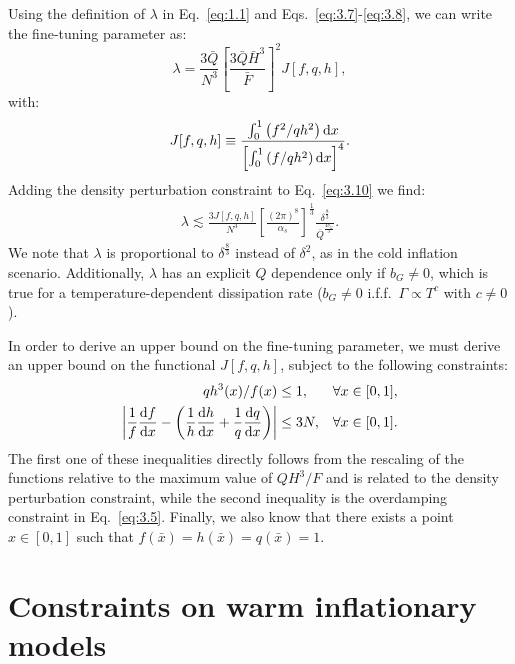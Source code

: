 \documentclass[aps,prd,twocolumn,amssymb,amsmath,floatfix,nofootinbib,superscriptaddress,preprintnumbers]{revtex4-1}
\begin{document}
Using the definition of $\lambda$ in Eq.~\ref{eq:1.1} and Eqs.~\ref{eq:3.7}-\ref{eq:3.8}, we can write the fine-tuning parameter as:
\begin{equation}
\lambda=\frac{3\bar{Q}}{N^{3}}\left[\frac{3 \bar{Q}\bar{H}^{3}}{\bar{F}}\right]^{2} J[f,q,h], \label{eq:3.10}
\end{equation}
with:
\begin{equation}
J[f, q,h] \equiv \frac{\int_{0}^{1}\left(f^{2} / qh^{2}\right) {\rm d} x}{\left[\int_{0}^{1}\left(f / qh^{2}\right) {\rm d} x\right]^{4}}. \label{eq:3.11}
\end{equation}
Adding the density perturbation constraint to Eq.~\ref{eq:3.10} we find:
\begin{align}
    \lambda\lesssim \frac{3 J[f,q,h]}{N^3} \left[\frac{(2\pi)^8}{\alpha_s}\right]^{\frac{1}{3}} \frac{\delta^{\frac{8}{3}}}{\bar{Q}^{\frac{4b_G}{3}}}. \label{eq:3.12}
\end{align}
We note that $\lambda$ is proportional to $\delta^{\frac{8}{3}}$ instead of $\delta^2$, as in the cold inflation scenario. Additionally, $\lambda$ has an explicit $Q$ dependence only if $b_G\neq 0$, which is true for a temperature-dependent dissipation rate ($b_G\neq0$ i.f.f.\ $\Gamma\propto T^c$ with $c\neq0$).

In order to derive an upper bound on the fine-tuning
parameter, we must derive an upper bound on the functional
$J[f,q,h]$, subject to the following constraints:
\begin{align}
qh^{3}(x) / f(x) &\leq 1, &  \forall x \in[0,1], \label{eq:3.13} \\
\left|\frac{1}{f} \frac{{\rm d} f}{{\rm d} x}-\left(\frac{1}{h} \frac{{\rm d} h}{{\rm d} x}+\frac{1}{q} \frac{{\rm d} q}{{\rm d} x}\right)\right| &\leq 3 N, &  \forall x \in[0,1]. \label{eq:3.14}
\end{align}
The first one of these inequalities directly follows from the rescaling of the functions relative to the maximum value of $QH^3/F$ and is related to the density perturbation constraint, while the second inequality is the overdamping constraint in Eq.~\ref{eq:3.5}. Finally, we also know that there exists a point $x\in[0, 1]$ such that $f(\bar{x})=h(\bar{x})=q(\bar{x})=1$.

\section{Constraints on warm inflationary models} \label{sec:4}
\end{document}
